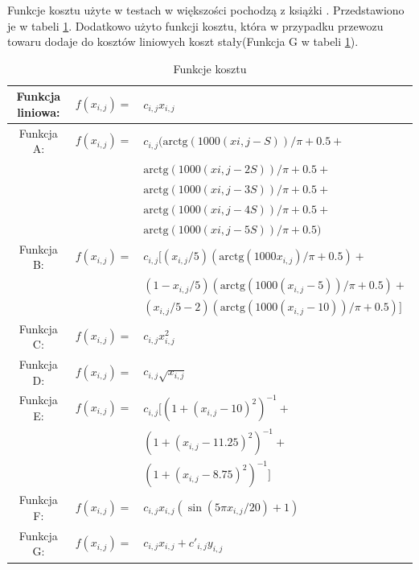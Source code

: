 Funkcje kosztu użyte w testach w większości pochodzą z książki \cite{ALG-GEN-BOOK}. Przedstawiono je w tabeli \ref{funkcje-kosztu}. Dodatkowo 
użyto funkcji kosztu, która w przypadku przewozu towaru dodaje do kosztów liniowych koszt stały(Funkcja G w tabeli \ref{funkcje-kosztu}).

\begin{table}[H]
    \begin{center}
        \begin{tabular}{ccl}
            Funkcja liniowa: & $f(x_{i,j})=$ & $c_{i,j} x_{i,j}$ \\
            \hline
            Funkcja A: & $f(x_{i,j})=$ & $c_{i,j}(\text{arctg}(1000 (x {i,j} - S))/\pi + 0.5 +$ \\
            & & $\text{arctg}(1000 (x {i,j} - 2 S))/\pi + 0.5 +$ \\
            & & $\text{arctg}(1000 (x {i,j} - 3 S))/\pi + 0.5 +$ \\
            & & $\text{arctg}(1000 (x {i,j} - 4 S))/\pi + 0.5 +$ \\
            & & $\text{arctg}(1000 (x {i,j} - 5 S))/\pi + 0.5)$ \\ 
            \hline
            Funkcja B: & $f(x_{i,j})=$ & $c_{i,j}[(x_{i,j}/5) (\text{arctg}(1000 x_{i,j})/\pi + 0.5) +$ \\
            & & $(1 - x_{i,j}/5) (\text{arctg}(1000(x_{i,j} - 5))/\pi + 0.5) +$ \\
            & & $(x_{i,j}/5 - 2) (\text{arctg}(1000(x_{i,j} - 10))/\pi + 0.5)]$ \\
            \hline
            Funkcja C: & $f(x_{i,j})=$ & $c_{i,j} x_{i,j}^2$ \\
            \hline
            Funkcja D: & $f(x_{i,j})=$ & $c_{i,j} \sqrt{x_{i,j}}$ \\
            \hline
            Funkcja E: & $f(x_{i,j})=$ & $c_{i,j}[(1 + (x_{i,j} - 10)^2)^{-1} +$ \\
            & & $(1 + (x_{i,j} - 11.25)^2)^{-1} +$ \\
            & & $(1 + (x_{i,j} - 8.75)^2)^{-1}]$ \\
            \hline
            Funkcja F: & $f(x_{i,j})=$ & $c_{i,j} x_{i,j} (\sin(5 \pi x_{i,j}/20) + 1)$ \\
            \hline
            Funkcja G: & $f(x_{i,j})=$ & $c_{i,j} x_{i,j} + c'_{i,j} y_{i,j}$ \\
        \end{tabular}
    \end{center}
    \caption{Funkcje kosztu}
    \label{funkcje-kosztu}
\end{table}


